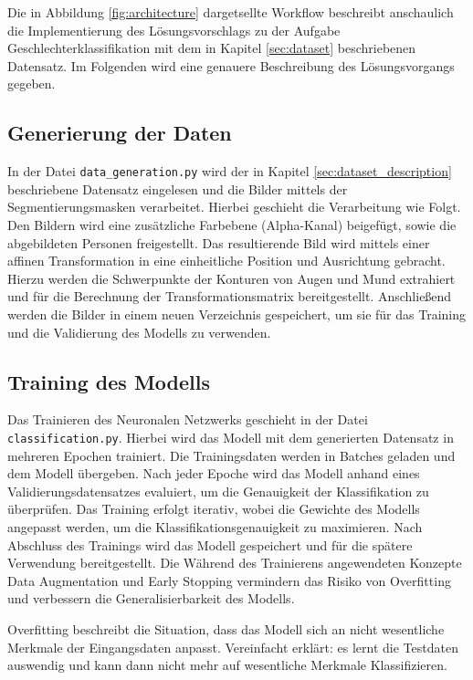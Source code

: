 \documentclass[journal,twoside,web]{ieeecolor}
\begin{document}
Die in Abbildung \ref{fig:architecture} dargetsellte Workflow beschreibt anschaulich die Implementierung des Lösungsvorschlags zu der Aufgabe Geschlechterklassifikation mit dem in Kapitel \ref{sec:dataset} beschriebenen Datensatz.
Im Folgenden wird eine genauere Beschreibung des Lösungsvorgangs gegeben.

\subsection{Generierung der Daten}
In der Datei \texttt{data\_generation.py} wird der in Kapitel \ref{sec:dataset_description} beschriebene Datensatz eingelesen und die Bilder mittels der Segmentierungsmasken verarbeitet. Hierbei geschieht die Verarbeitung wie Folgt. Den Bildern wird eine zusätzliche Farbebene (Alpha-Kanal) beigefügt, sowie die abgebildeten Personen freigestellt. Das resultierende Bild wird mittels einer affinen Transformation in eine einheitliche Position und Ausrichtung gebracht. Hierzu werden die Schwerpunkte der Konturen von Augen und Mund extrahiert und für die Berechnung der Transformationsmatrix bereitgestellt. Anschließend werden die Bilder in einem neuen Verzeichnis gespeichert, um sie für das Training und die Validierung des Modells zu verwenden.


\subsection{Training des Modells}
\label{sec:training}
Das Trainieren des Neuronalen Netzwerks geschieht in der Datei \texttt{classification.py}. Hierbei wird das Modell mit dem generierten Datensatz in mehreren Epochen trainiert. Die Trainingsdaten werden in Batches geladen und dem Modell übergeben. Nach jeder Epoche wird das Modell anhand eines Validierungsdatensatzes evaluiert, um die Genauigkeit der Klassifikation zu überprüfen. Das Training erfolgt iterativ, wobei die Gewichte des Modells angepasst werden, um die Klassifikationsgenauigkeit zu maximieren. Nach Abschluss des Trainings wird das Modell gespeichert und für die spätere Verwendung bereitgestellt. Die Während des Trainierens angewendeten Konzepte Data Augmentation und Early Stopping vermindern das Risiko von Overfitting und verbessern die Generalisierbarkeit des Modells.

Overfitting beschreibt die Situation, dass das Modell sich an nicht wesentliche Merkmale der Eingangsdaten anpasst. Vereinfacht erklärt: es lernt die Testdaten auswendig und kann dann nicht mehr auf wesentliche Merkmale Klassifizieren.
\end{document}
